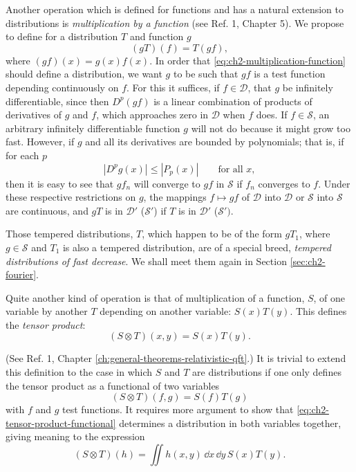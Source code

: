 Another operation which is defined for functions and has a natural extension to
distributions is \emph{multiplication by a function} (see Ref. 1, Chapter 5).
We propose to define for a distribution $T$ and function $g$
\begin{equation}
  (gT)(f)=T(gf),
\tag{2-26}\label{eq:ch2-multiplication-function}
\end{equation}
where $(gf)(x)=g(x)f(x)$. In order that \eqref{eq:ch2-multiplication-function} should define a distribution,
we want $g$ to be such that $gf$ is a test function depending continuously on
$f$. For this it suffices, if $f\in\mathcal{D}$, that $g$ be infinitely
differentiable, since then $D^p(gf)$ is a linear combination of products of
derivatives of $g$ and $f$, which approaches zero in $\mathcal{D}$ when $f$
does. If $f\in\mathcal{S}$, an arbitrary infinitely differentiable function
$g$ will not do because it might grow too fast. However, if $g$ and all its
derivatives are bounded by polynomials; that is, if for each $p$
\begin{equation*}
  |D^pg(x)|\le|P_p(x)|\qquad\text{for all }x,
\end{equation*}
then it is easy to see that $gf_n$ will converge to $gf$ in $\mathcal{S}$ if
$f_n$ converges to $f$. Under these respective restrictions on $g$, the
mappings $f\mapsto gf$ of $\mathcal{D}$ into $\mathcal{D}$ or $\mathcal{S}$
into $\mathcal{S}$ are continuous, and $gT$ is in $\mathcal{D}'$ ($\mathcal{S}'$)
if $T$ is in $\mathcal{D}'$ ($\mathcal{S}')$.

Those tempered distributions, $T$, which happen to be of the form $gT_1$,
where $g\in\mathcal{S}$ and $T_1$ is also a tempered distribution, are of a
special breed, \emph{tempered distributions of fast decrease}. We shall meet
them again in Section \ref{sec:ch2-fourier}.

Quite another kind of operation is that of multiplication of a function, $S$,
of one variable by another $T$ depending on another variable: $S(x)T(y)$.
This defines the \emph{tensor product}:
\begin{equation*}
  (S\otimes T)(x,y)=S(x)T(y).
\end{equation*}

(See Ref. 1, Chapter \ref{ch:general-theorems-relativistic-qft}.) It is trivial to extend this definition to the
case in which $S$ and $T$ are distributions if one only defines the tensor
product as a functional of two variables
\begin{equation}
  (S\otimes T)(f,g)=S(f)T(g)
\tag{2-27}\label{eq:ch2-tensor-product-functional}
\end{equation}
with $f$ and $g$ test functions. It requires more argument to show that \eqref{eq:ch2-tensor-product-functional}
determines a distribution in both variables together, giving meaning to the
expression
\begin{equation*}
  (S\otimes T)(h)=\iint h(x,y)\,\dd x\,\dd y\,S(x)T(y).
\end{equation*}

